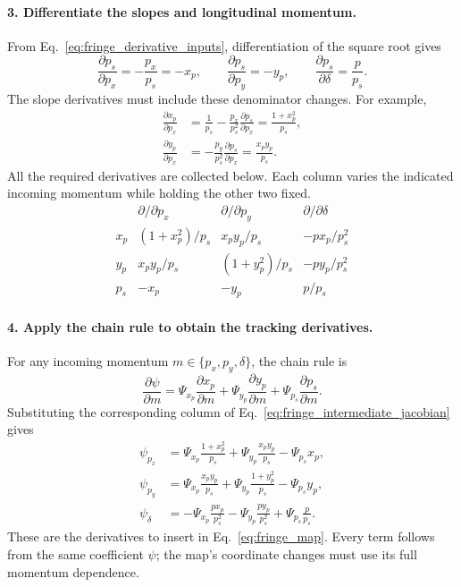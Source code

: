 \paragraph{3. Differentiate the slopes and longitudinal momentum.}
From Eq.~\eqref{eq:fringe_derivative_inputs}, differentiation of the square
root gives
\begin{equation}
 \frac{\partial p_s}{\partial p_x}=-\frac{p_x}{p_s}=-x_p,\qquad
 \frac{\partial p_s}{\partial p_y}=-y_p,\qquad
 \frac{\partial p_s}{\partial\delta}=\frac{p}{p_s}.
\end{equation}
The slope derivatives must include these denominator changes. For example,
\begin{align}
 \frac{\partial x_p}{\partial p_x}
 &=\frac{1}{p_s}-\frac{p_x}{p_s^2}\frac{\partial p_s}{\partial p_x}
  =\frac{1+x_p^2}{p_s},\\
 \frac{\partial y_p}{\partial p_x}
 &=-\frac{p_y}{p_s^2}\frac{\partial p_s}{\partial p_x}
  =\frac{x_py_p}{p_s}.
\end{align}
All the required derivatives are collected below. Each column varies the
indicated incoming momentum while holding the other two fixed.
\begin{equation}
\begin{array}{c|ccc}
 & \partial/\partial p_x & \partial/\partial p_y & \partial/\partial\delta\\[3pt]
\hline
 x_p & (1+x_p^2)/p_s & x_py_p/p_s & -p x_p/p_s^2\\[3pt]
 y_p & x_py_p/p_s & (1+y_p^2)/p_s & -p y_p/p_s^2\\[3pt]
 p_s & -x_p & -y_p & p/p_s
\end{array}
\label{eq:fringe_intermediate_jacobian}
\end{equation}

\paragraph{4. Apply the chain rule to obtain the tracking derivatives.}
For any incoming momentum $m\in\{p_x,p_y,\delta\}$, the chain rule is
\begin{equation}
 \frac{\partial\psi}{\partial m}
 =\Psi_{x_p}\frac{\partial x_p}{\partial m}
 +\Psi_{y_p}\frac{\partial y_p}{\partial m}
 +\Psi_{p_s}\frac{\partial p_s}{\partial m}.
\end{equation}
Substituting the corresponding column of
Eq.~\eqref{eq:fringe_intermediate_jacobian} gives
\begin{align}
 \psi_{p_x}
 &=\Psi_{x_p}\frac{1+x_p^2}{p_s}
   +\Psi_{y_p}\frac{x_py_p}{p_s}-\Psi_{p_s}x_p,\\
 \psi_{p_y}
 &=\Psi_{x_p}\frac{x_py_p}{p_s}
   +\Psi_{y_p}\frac{1+y_p^2}{p_s}-\Psi_{p_s}y_p,\\
 \psi_\delta
 &=-\Psi_{x_p}\frac{p x_p}{p_s^2}
   -\Psi_{y_p}\frac{p y_p}{p_s^2}+\Psi_{p_s}\frac{p}{p_s}.
 \label{eq:fringe_momentum_derivatives}
\end{align}
These are the derivatives to insert in Eq.~\eqref{eq:fringe_map}. Every
term follows from the same coefficient $\psi$; the map's coordinate
changes must use its full momentum dependence.

